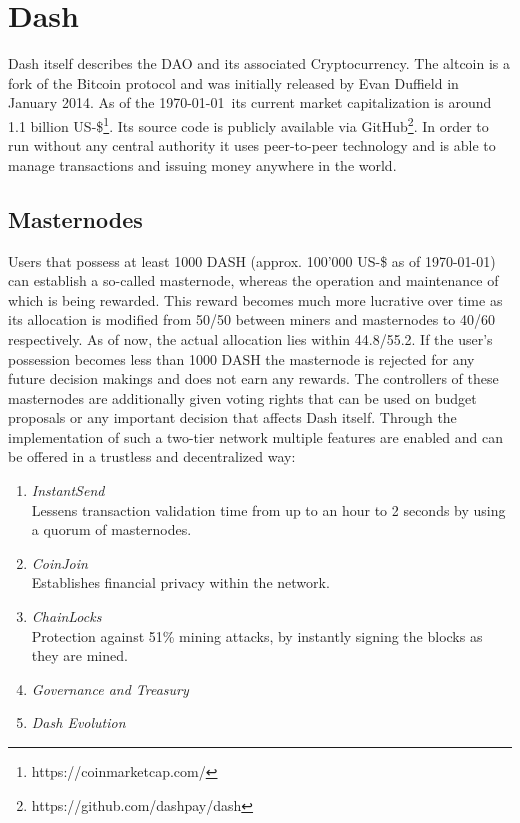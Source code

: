 \documentclass[a4paper,12pt]{report}
\begin{document}
	\section[Dash]{Dash \cite{DashDAODocs}} \label{Dash}
	\startsection
	    Dash itself describes the DAO and its associated Cryptocurrency. The altcoin is a fork of the Bitcoin protocol and was initially released by Evan Duffield in January 2014. As of the \today \ its current market capitalization is around 1.1 billion US-\$\footnote{\hspace{0.5em}https://coinmarketcap.com/}. Its source code is publicly available via GitHub\footnote{\hspace{0.5em}https://github.com/dashpay/dash}. In order to run without any central authority it uses peer-to-peer technology and is able to manage transactions and issuing money anywhere in the world.
	    \subsection{Masternodes} \label{Masternodes}
	    \startsubsection
	        Users that possess at least 1000 DASH (approx. 100'000 US-\$ as of \today) can establish a so-called masternode, whereas the operation and maintenance of which is being rewarded. This reward becomes much more lucrative over time as its allocation is modified from 50/50 between miners and masternodes to 40/60 respectively. As of now, the actual allocation lies within 44.8/55.2. If the user's possession becomes less than 1000 DASH the masternode is rejected for any future decision makings and does not earn any rewards. The controllers of these masternodes are additionally given voting rights that can be used on budget proposals or any important decision that affects Dash itself. Through the implementation of such a two-tier network multiple features are enabled and can be offered in a trustless and decentralized way:
	        \begin{enumerate}
	            \item \textit{InstantSend} \\
	            Lessens transaction validation time from up to an hour to 2 seconds by using a quorum of masternodes.
	            \item \textit{CoinJoin} \\
	            Establishes financial privacy within the network.
	            \item \textit{ChainLocks} \\
	            Protection against 51\% mining attacks, by instantly signing the blocks as they are mined.
	            \item \textit{Governance and Treasury}
	            \item \textit{Dash Evolution}
	        \end{enumerate}
	    \closesection
\end{document}
